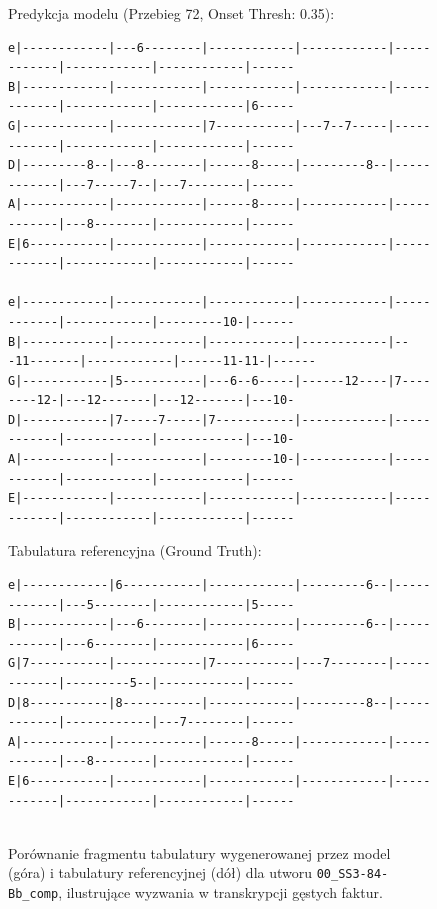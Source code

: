 \begin{figure}[H]
    \centering
    \caption{Porównanie fragmentu tabulatury wygenerowanej przez model (góra) i tabulatury referencyjnej (dół) dla utworu \texttt{00\_SS3-84-Bb\_comp}, ilustrujące wyzwania w transkrypcji gęstych faktur.}
    \label{fig:tab_low_quality}
    \vspace{5pt}
    \centerline{\textsf{Predykcja modelu (Przebieg 72, Onset Thresh: 0.35):}}
    {\scriptsize
\begin{verbatim}
e|------------|---6--------|------------|------------|------------|------------|------------|------
B|------------|------------|------------|------------|------------|------------|------------|6-----
G|------------|------------|7-----------|---7--7-----|------------|------------|------------|------
D|---------8--|---8--------|------8-----|---------8--|------------|---7-----7--|---7--------|------
A|------------|------------|------8-----|------------|------------|---8--------|------------|------
E|6-----------|------------|------------|------------|------------|------------|------------|------

e|------------|------------|------------|------------|------------|------------|---------10-|------
B|------------|------------|------------|------------|---11-------|------------|------11-11-|------
G|------------|5-----------|---6--6-----|------12----|7--------12-|---12-------|---12-------|---10-
D|------------|7-----7-----|7-----------|------------|------------|------------|------------|---10-
A|------------|------------|---------10-|------------|------------|------------|------------|------
E|------------|------------|------------|------------|------------|------------|------------|------
\end{verbatim}
    }
    \vspace{5pt}
    \centerline{\textsf{Tabulatura referencyjna (Ground Truth):}}
    {\scriptsize
\begin{verbatim}
e|------------|6-----------|------------|---------6--|------------|---5--------|------------|5-----
B|------------|---6--------|------------|---------6--|------------|---6--------|------------|6-----
G|7-----------|------------|7-----------|---7--------|------------|---------5--|------------|------
D|8-----------|8-----------|------------|---------8--|------------|------------|---7--------|------
A|------------|------------|------8-----|------------|------------|---8--------|------------|------
E|6-----------|------------|------------|------------|------------|------------|------------|------


\end{verbatim}}
\end{figure}
